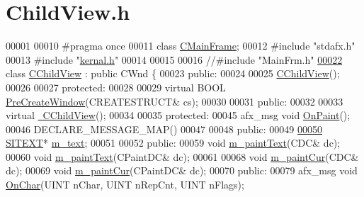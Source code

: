 \hypertarget{_child_view_8h_source}{}\section{Child\+View.\+h}
\label{_child_view_8h_source}

\begin{DoxyCode}
00001 
00010 \textcolor{preprocessor}{#pragma once}
00011 \textcolor{keyword}{class }\hyperlink{class_c_main_frame}{CMainFrame};
00012 \textcolor{preprocessor}{#include "stdafx.h"}
00013 \textcolor{preprocessor}{#include "\hyperlink{kernal_8h}{kernal.h}"}
00014 
00015 
00016 \textcolor{comment}{//#include "MainFrm.h"}
\hyperlink{class_c_child_view}{00022} \textcolor{comment}{}\textcolor{keyword}{class }\hyperlink{class_c_child_view}{CChildView} : \textcolor{keyword}{public} CWnd \{
00023  \textcolor{keyword}{public}:
00024   
00025   \hyperlink{class_c_child_view_aff5af7c162c10755edbe58f260ded6d4}{CChildView}();
00026 
00027  \textcolor{keyword}{protected}:
00028   
00029   \textcolor{keyword}{virtual} BOOL \hyperlink{class_c_child_view_a07e87a6c3606422ff10d45a47d702c7e}{PreCreateWindow}(CREATESTRUCT& cs);
00030 
00031  \textcolor{keyword}{public}:
00032  
00033   \textcolor{keyword}{virtual} \hyperlink{class_c_child_view_a5b033b5e0a130950719a173b86418698}{~CChildView}(); 
00034 
00035  \textcolor{keyword}{protected}:
00045   afx\_msg \textcolor{keywordtype}{void} \hyperlink{class_c_child_view_a8ea6d42631a4f9f446923ff864b239ab}{OnPaint}();
00046   DECLARE\_MESSAGE\_MAP()
00047 
00048  \textcolor{keyword}{public}:
00049   
\hyperlink{class_c_child_view_a7a8d14e1c1adfb50fa6e033ebc05a357}{00050}   \hyperlink{class_s_i_t_e_x_t}{SITEXT}* \hyperlink{class_c_child_view_a7a8d14e1c1adfb50fa6e033ebc05a357}{m\_text};
00051 
00052  \textcolor{keyword}{public}:
00059   \textcolor{keywordtype}{void} \hyperlink{class_c_child_view_a4764e41ed2ac3f2ce69916b3881894fe}{m\_paintText}(CDC& dc);
00060   \textcolor{keywordtype}{void} \hyperlink{class_c_child_view_a4764e41ed2ac3f2ce69916b3881894fe}{m\_paintText}(CPaintDC& dc);
00061 
00068   \textcolor{keywordtype}{void} \hyperlink{class_c_child_view_a434383ba85ab567141366ecddeb2c9d6}{m\_paintCur}(CDC& dc);
00069   \textcolor{keywordtype}{void} \hyperlink{class_c_child_view_a434383ba85ab567141366ecddeb2c9d6}{m\_paintCur}(CPaintDC& dc);
00070  \textcolor{keyword}{public}:
00079   afx\_msg \textcolor{keywordtype}{void} \hyperlink{class_c_child_view_af29ede94259b52b2ad54d139ff554abe}{OnChar}(UINT nChar, UINT nRepCnt, UINT nFlags);

\end{DoxyCode}
